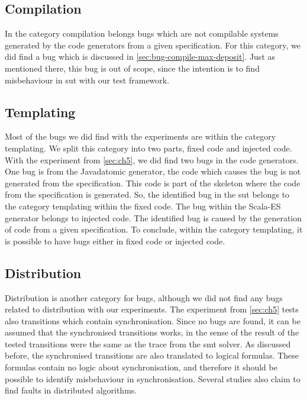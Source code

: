 \subsection{Compilation}
In the category compilation belongs bugs which are not compilable systems generated by the code generators from a given specification. For this category, we did find a bug which is discussed in \autoref{sec:bug-compile-max-deposit}. Just as mentioned there, this bug is out of scope, since the intention is to find misbehaviour in \gls{sut} with our test framework.

\subsection{Templating}
Most of the bugs we did find with the experiments are within the category templating. We split this category into two parts, fixed code and injected code. With the experiment from \autoref{sec:ch5}, we did find two bugs in the code generators. One bug is from the Javadatomic generator, the code which causes the bug is not generated from the specification. This code is part of the skeleton where the code from the specification is generated. So, the identified bug in the \gls{sut} belongs to the category templating within the fixed code. The bug within the Scala-ES generator belongs to injected code. The identified bug is caused by the generation of code from a given specification. To conclude, within the category templating, it is possible to have bugs either in fixed code or injected code.

\subsection{Distribution}
Distribution is another category for bugs, although we did not find any bugs related to distribution with our experiments. The experiment from \autoref{sec:ch5} tests also transitions which contain synchronisation. Since no bugs are found, it can be assumed that the synchronised transitions works, in the sense of the result of the tested transitions were the same as the trace from the \gls{smt} solver. As discussed before, the synchronised transitions are also translated to logical formulas. These formulas contain no logic about synchronisation, and therefore it should be possible to identify misbehaviour in synchronisation. Several studies also claim to find faults in distributed algorithms.

